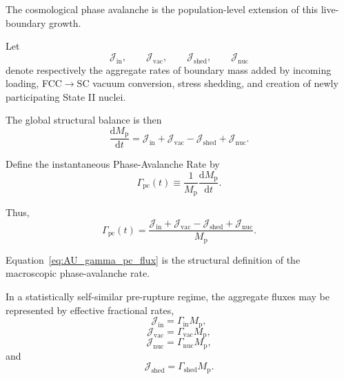 The cosmological phase avalanche is the population-level extension of this
live-boundary growth.

Let
\begin{equation}
    \mathcal J_{\mathrm{in}},
    \qquad
    \mathcal J_{\mathrm{vac}},
    \qquad
    \mathcal J_{\mathrm{shed}},
    \qquad
    \mathcal J_{\mathrm{nuc}}
\end{equation}
denote respectively the aggregate rates of boundary mass added by incoming
loading, FCC$\rightarrow$SC vacuum conversion, stress shedding, and creation
of newly participating State II nuclei.

The global structural balance is then
\begin{equation}
    \boxed{
    \frac{
        \mathrm dM_{\mathrm p}
    }{
        \mathrm dt
    }
    =
    \mathcal J_{\mathrm{in}}
    +
    \mathcal J_{\mathrm{vac}}
    -
    \mathcal J_{\mathrm{shed}}
    +
    \mathcal J_{\mathrm{nuc}}.
    }
    \label{eq:AU_phase_avalanche_master}
\end{equation}

Define the instantaneous Phase-Avalanche Rate by
\begin{equation}
    \boxed{
    \Gamma_{\mathrm{pc}}(t)
    \equiv
    \frac{1}{
        M_{\mathrm p}
    }
    \frac{
        \mathrm dM_{\mathrm p}
    }{
        \mathrm dt
    }.
    }
    \label{eq:AU_gamma_pc_definition}
\end{equation}

Thus,
\begin{equation}
    \boxed{
    \Gamma_{\mathrm{pc}}(t)
    =
    \frac{
        \mathcal J_{\mathrm{in}}
        +
        \mathcal J_{\mathrm{vac}}
        -
        \mathcal J_{\mathrm{shed}}
        +
        \mathcal J_{\mathrm{nuc}}
    }{
        M_{\mathrm p}
    }.
    }
    \label{eq:AU_gamma_pc_flux}
\end{equation}

Equation~\eqref{eq:AU_gamma_pc_flux}
is the structural definition of the macroscopic phase-avalanche rate.

In a statistically self-similar pre-rupture regime, the aggregate fluxes may
be represented by effective fractional rates,
\begin{equation}
    \mathcal J_{\mathrm{in}}
    =
    \Gamma_{\mathrm{in}}
    M_{\mathrm p},
\end{equation}
\begin{equation}
    \mathcal J_{\mathrm{vac}}
    =
    \Gamma_{\mathrm{vac}}
    M_{\mathrm p},
\end{equation}
\begin{equation}
    \mathcal J_{\mathrm{nuc}}
    =
    \Gamma_{\mathrm{nuc}}
    M_{\mathrm p},
\end{equation}
and
\begin{equation}
    \mathcal J_{\mathrm{shed}}
    =
    \Gamma_{\mathrm{shed}}
    M_{\mathrm p}.
\end{equation}

